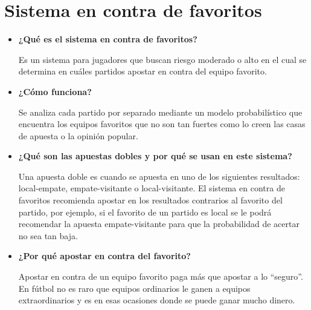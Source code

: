 \section{Sistema en contra de favoritos}
\begin{itemize}

\item \textbf{¿Qué es el sistema en contra de favoritos?}


Es un sistema para jugadores que buscan riesgo moderado o alto en el cual se determina en cuáles partidos apostar en contra del equipo favorito.

\item \textbf{¿Cómo funciona?}


Se analiza cada partido por separado mediante un modelo probabilístico que encuentra los equipos favoritos que no son tan fuertes como lo creen las casas de apuesta o la opinión popular.

\item \textbf{¿Qué son las apuestas dobles y por qué se usan en este sistema?}


Una apuesta doble es cuando se apuesta en uno de los siguientes resultados: local-empate, empate-visitante o local-visitante. El sistema en contra de favoritos recomienda apostar en los resultados contrarios al favorito del partido, por ejemplo, si el favorito de un partido es local se le podrá recomendar la apuesta empate-visitante para que la probabilidad de acertar no sea tan baja.

\item \textbf{¿Por qué apostar en contra del favorito?}


Apostar en contra de un equipo favorito paga más que apostar a lo “seguro”. En fútbol no es raro que equipos ordinarios le ganen a equipos extraordinarios y es en esas ocasiones donde se puede ganar mucho dinero.

\end{itemize}

